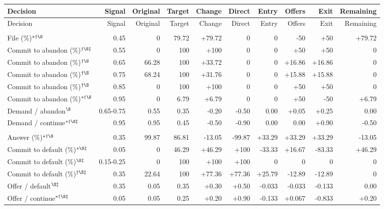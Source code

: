 \documentclass[10pt]{article}
\begin{document}
{\small\setlength{\tabcolsep}{3pt}\begin{longtable}{@{}>{\raggedright\arraybackslash}p{1.65in}rrrrrrrrr@{}}
\toprule Decision & Signal & Original & Target & Change & Direct & Entry & Offers & Exit & Remaining \\\midrule\endfirsthead
\toprule Decision & Signal & Original & Target & Change & Direct & Entry & Offers & Exit & Remaining \\\midrule\endhead
\bottomrule\endfoot
\multicolumn{10}{@{}l}{\textbf{Plaintiff}}\\
File (\%)$^{*\dagger\S}$ & 0.45 & 0 & 79.72 & +79.72 & 0 & 0 & -50 & +50 & +79.72\\
Commit to abandon (\%)$^{\dagger\S\ddagger}$ & 0.55 & 0 & 100 & +100 & 0 & 0 & +50 & +50 & 0\\
Commit to abandon (\%)$^{\dagger\S}$ & 0.65 & 66.28 & 100 & +33.72 & 0 & 0 & +16.86 & +16.86 & 0\\
Commit to abandon (\%)$^{\dagger\S}$ & 0.75 & 68.24 & 100 & +31.76 & 0 & 0 & +15.88 & +15.88 & 0\\
Commit to abandon (\%)$^{\dagger\S}$ & 0.85 & 0 & 100 & +100 & 0 & 0 & +50 & +50 & 0\\
Commit to abandon (\%)$^{*\dagger\S}$ & 0.95 & 0 & 6.79 & +6.79 & 0 & 0 & +50 & -50 & +6.79\\
Demand / abandon$^{\S}$ & 0.65-0.75 & 0.55 & 0.35 & -0.20 & -0.50 & 0.00 & +0.05 & +0.25 & 0.00\\
Demand / continue$^{*\dagger\S\ddagger}$ & 0.95 & 0.95 & 0.45 & -0.50 & -0.90 & 0.00 & 0.00 & +0.90 & -0.50\\
\multicolumn{10}{@{}l}{\textbf{Defendant}}\\
Answer (\%)$^{*\dagger\S}$ & 0.35 & 99.87 & 86.81 & -13.05 & -99.87 & +33.29 & +33.29 & +33.29 & -13.05\\
Commit to default (\%)$^{*\S\ddagger}$ & 0.05 & 0 & 46.29 & +46.29 & +100 & -33.33 & +16.67 & -83.33 & +46.29\\
Commit to default (\%)$^{\S\ddagger}$ & 0.15-0.25 & 0 & 100 & +100 & +100 & 0 & 0 & 0 & 0\\
Commit to default (\%)$^{\dagger\S\ddagger}$ & 0.35 & 22.64 & 100 & +77.36 & +77.36 & +25.79 & -12.89 & -12.89 & 0\\
Offer / default$^{\S\ddagger}$ & 0.35 & 0.05 & 0.35 & +0.30 & +0.50 & -0.033 & -0.033 & -0.133 & 0.00\\
Offer / continue$^{*\dagger\S\ddagger}$ & 0.05 & 0.05 & 0.25 & +0.20 & +0.90 & -0.133 & +0.067 & -0.833 & +0.20\\
\end{longtable}}
\end{document}
